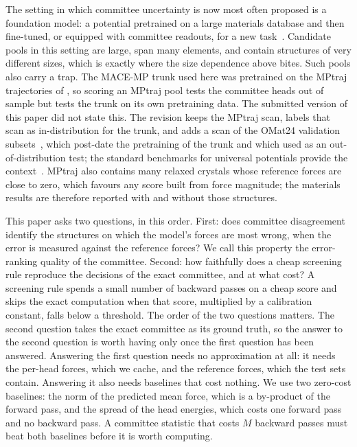 The setting in which committee uncertainty is now most often proposed is a
foundation model: a potential pretrained on a large materials database and
then fine-tuned, or equipped with committee readouts, for a new
task~\citep{deng2023chgnet,batatia2023foundation,bilbrey2025foundation}.
Candidate pools in this setting are large, span many elements, and contain
structures of very different sizes, which is exactly where the size dependence
above bites. Such pools also carry a trap. The MACE-MP trunk used here was
pretrained on the MPtraj trajectories of \citet{deng2023chgnet}, so scoring an
MPtraj pool tests the committee heads out of sample but tests the trunk on its
own pretraining data. The submitted version of this paper did not state this.
The revision keeps the MPtraj scan, labels that scan as in-distribution for the
trunk, and adds a scan of the OMat24 validation
subsets~\citep{barrosoluque2024omat24}, which post-date the pretraining of the
trunk and which \citet{beck2025committee} used as an out-of-distribution test;
the standard benchmarks for universal potentials provide the
context~\citep{riebesell2025matbench}. MPtraj also contains many relaxed
crystals whose reference forces are close to zero, which favours any score
built from force magnitude; the materials results are therefore reported with
and without those structures.

This paper asks two questions, in this order. First: does committee
disagreement identify the structures on which the model's forces are most
wrong, when the error is measured against the reference forces? We call this
property the error-ranking quality of the committee. Second: how faithfully
does a cheap screening rule reproduce the decisions of the exact committee,
and at what cost? A screening rule spends a small number of backward passes on
a cheap score and skips the exact computation when that score, multiplied by a
calibration constant, falls below a threshold. The order of the two questions
matters. The second question takes the exact committee as its ground truth, so
the answer to the second question is worth having only once the first question
has been answered. Answering the first question needs no approximation at all:
it needs the per-head forces, which we cache, and the reference forces, which
the test sets contain. Answering it also needs baselines that cost nothing. We
use two zero-cost baselines: the norm of the predicted mean force, which is a
by-product of the forward pass, and the spread of the head energies, which
costs one forward pass and no backward pass. A committee statistic that costs
$M$ backward passes must beat both baselines before it is worth computing.

